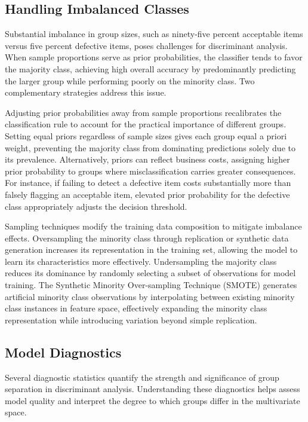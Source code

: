 \documentclass[
]{article}
\begin{document}
\subsection{Handling Imbalanced Classes}

Substantial imbalance in group sizes, such as ninety-five percent
acceptable items versus five percent defective items, poses challenges
for discriminant analysis. When sample proportions serve as prior
probabilities, the classifier tends to favor the majority class,
achieving high overall accuracy by predominantly predicting the larger
group while performing poorly on the minority class. Two complementary
strategies address this issue.

Adjusting prior probabilities away from sample proportions recalibrates
the classification rule to account for the practical importance of
different groups. Setting equal priors regardless of sample sizes gives
each group equal a priori weight, preventing the majority class from
dominating predictions solely due to its prevalence. Alternatively,
priors can reflect business costs, assigning higher prior probability to
groups where misclassification carries greater consequences. For
instance, if failing to detect a defective item costs substantially more
than falsely flagging an acceptable item, elevated prior probability for
the defective class appropriately adjusts the decision threshold.

Sampling techniques modify the training data composition to mitigate
imbalance effects. Oversampling the minority class through replication
or synthetic data generation increases its representation in the
training set, allowing the model to learn its characteristics more
effectively. Undersampling the majority class reduces its dominance by
randomly selecting a subset of observations for model training. The
Synthetic Minority Over-sampling Technique (SMOTE) generates artificial
minority class observations by interpolating between existing minority
class instances in feature space, effectively expanding the minority
class representation while introducing variation beyond simple
replication.

\subsection{Model Diagnostics}

Several diagnostic statistics quantify the strength and significance of
group separation in discriminant analysis. Understanding these
diagnostics helps assess model quality and interpret the degree to which
groups differ in the multivariate space.
\end{document}

